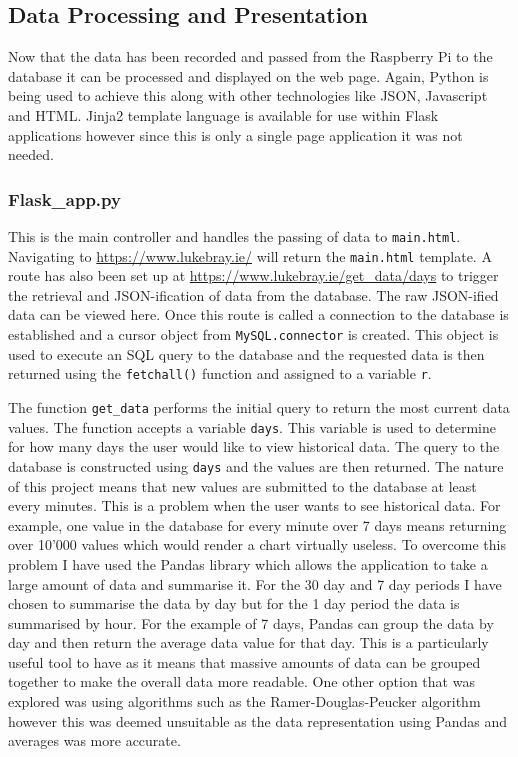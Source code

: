 \documentclass[10pt,a4paper]{article}
\begin{document}
\subsection{Data Processing and Presentation}
Now that the data has been recorded and passed from the Raspberry Pi to the database it can be processed and displayed on the web page. Again, Python is being used to achieve this along with other technologies like JSON, Javascript and HTML. Jinja2 template language is available for use within Flask applications however since this is only a single page application it was not needed. 

\subsubsection{Flask\_app.py}
This is the main controller and handles the passing of data to \texttt{main.html}. Navigating to \url{https://www.lukebray.ie/} will return the \texttt{main.html} template. A route has also been set up at \url{https://www.lukebray.ie/get_data/days} to trigger the retrieval and JSON-ification of data from the database. The raw JSON-ified data can be viewed here. Once this route is called a connection to the database is established and a cursor object from \texttt{MySQL.connector} is created. This object is used to execute an SQL query to the database and the requested data is then returned using the \texttt{fetchall()} function and assigned to a variable \texttt{r}. 

The function \texttt{get\_data} performs the initial query to return the most current data values. The function accepts a variable \texttt{days}. This variable is used to determine for how many days the user would like to view historical data. The query to the database is constructed using \texttt{days} and the values are then returned. The nature of this project means that new values are submitted to the database at least every minutes. This is a problem when the user wants to see historical data. For example, one value in the database for every minute over 7 days means returning over 10'000 values which would render a chart virtually useless. To overcome this problem I have used the Pandas\citep{pandas} library which allows the application to take a large amount of data and summarise it. For the 30 day and 7 day periods I have chosen to summarise the data by day but for the 1 day period the data is summarised by hour. For the example of 7 days, Pandas can group the data by day and then return the average data value for that day. This is a particularly useful tool to have as it means that massive amounts of data can be grouped together to make the overall data more readable. One other option that was explored was using algorithms such as the Ramer-Douglas-Peucker\citep{douglaspeucker} algorithm however this was deemed unsuitable as the data representation using Pandas and averages was more accurate. 
\end{document}
